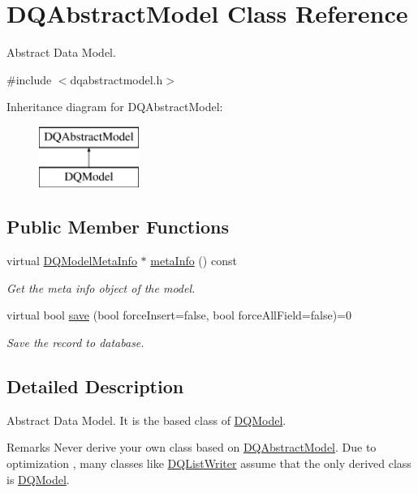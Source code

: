 \hypertarget{classDQAbstractModel}{
\section{DQAbstractModel Class Reference}
\label{classDQAbstractModel}
}


Abstract Data Model.  




{\ttfamily \#include $<$dqabstractmodel.h$>$}

Inheritance diagram for DQAbstractModel:\begin{figure}[H]
\begin{center}
\leavevmode
\includegraphics[height=2.000000cm]{classDQAbstractModel}
\end{center}
\end{figure}
\subsection*{Public Member Functions}
\begin{DoxyCompactItemize}
\item 
\hypertarget{classDQAbstractModel_ab03df8f9993c3fc76f41b0d40eacfa41}{
virtual \hyperlink{classDQModelMetaInfo}{DQModelMetaInfo} $\ast$ \hyperlink{classDQAbstractModel_ab03df8f9993c3fc76f41b0d40eacfa41}{metaInfo} () const }
\label{classDQAbstractModel_ab03df8f9993c3fc76f41b0d40eacfa41}

\begin{DoxyCompactList}\small\item\em Get the meta info object of the model. \item\end{DoxyCompactList}\item 
virtual bool \hyperlink{classDQAbstractModel_a15358dd33ad88210b44233337ad8b065}{save} (bool forceInsert=false, bool forceAllField=false)=0
\begin{DoxyCompactList}\small\item\em Save the record to database. \item\end{DoxyCompactList}\end{DoxyCompactItemize}


\subsection{Detailed Description}
Abstract Data Model. It is the based class of \hyperlink{classDQModel}{DQModel}. \begin{DoxyRemark}{Remarks}
Never derive your own class based on \hyperlink{classDQAbstractModel}{DQAbstractModel}. Due to optimization , many classes like \hyperlink{classDQListWriter}{DQListWriter} assume that the only derived class is \hyperlink{classDQModel}{DQModel}. 
\end{DoxyRemark}


